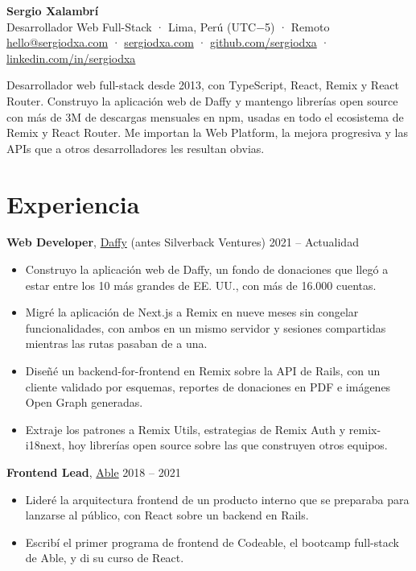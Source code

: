 \documentclass[10pt,letterpaper]{article}
\begin{document}
\begin{center}
{\LARGE\bfseries Sergio Xalambrí}\\[3pt]
Desarrollador Web Full-Stack · Lima, Perú (UTC−5) · Remoto\\[2pt]
{\small \href{mailto:hello@sergiodxa.com}{hello@sergiodxa.com} · \href{https://sergiodxa.com}{sergiodxa.com} · \href{https://github.com/sergiodxa}{github.com/sergiodxa} · \href{https://www.linkedin.com/in/sergiodxa/}{linkedin.com/in/sergiodxa}}
\end{center}

Desarrollador web full-stack desde 2013, con TypeScript, React, Remix y React Router. Construyo la aplicación web de Daffy y mantengo librerías open source con más de 3M de descargas mensuales en npm, usadas en todo el ecosistema de Remix y React Router. Me importan la Web Platform, la mejora progresiva y las APIs que a otros desarrolladores les resultan obvias.

\section*{Experiencia}
\textbf{Web Developer}, \href{https://www.daffy.org}{Daffy} {\color{muted}(antes Silverback Ventures)} \hfill {\color{muted}2021 – Actualidad}
\begin{itemize}
\item Construyo la aplicación web de Daffy, un fondo de donaciones que llegó a estar entre los 10 más grandes de EE. UU., con más de 16.000 cuentas.
\item Migré la aplicación de Next.js a Remix en nueve meses sin congelar funcionalidades, con ambos en un mismo servidor y sesiones compartidas mientras las rutas pasaban de a una.
\item Diseñé un backend-for-frontend en Remix sobre la API de Rails, con un cliente validado por esquemas, reportes de donaciones en PDF e imágenes Open Graph generadas.
\item Extraje los patrones a Remix Utils, estrategias de Remix Auth y remix-i18next, hoy librerías open source sobre las que construyen otros equipos.
\end{itemize}

\textbf{Frontend Lead}, \href{https://able.co}{Able} \hfill {\color{muted}2018 – 2021}
\begin{itemize}
\item Lideré la arquitectura frontend de un producto interno que se preparaba para lanzarse al público, con React sobre un backend en Rails.
\item Escribí el primer programa de frontend de Codeable, el bootcamp full-stack de Able, y di su curso de React.
\end{itemize}
\end{document}
